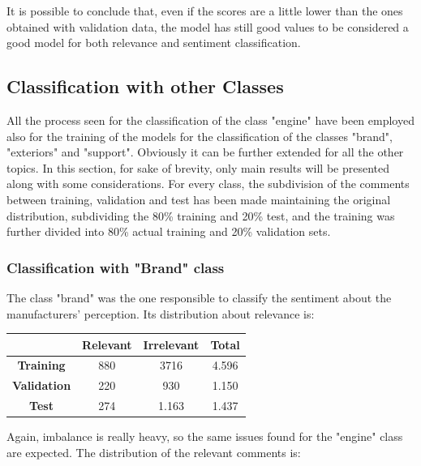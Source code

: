 It is possible to conclude that, even if the scores are a little lower than the ones obtained with validation data, the model has still good values to be considered a good model for both relevance and sentiment classification.


\subsection{Classification with other Classes}

All the process seen for the classification of the class "engine" have been employed also for the training of the models for the classification of the classes "brand", "exteriors" and "support". Obviously it can be further extended for all the other topics. In this section, for sake of brevity, only main results will be presented along with some considerations. For every class, the subdivision of the comments between training, validation and test has been made maintaining the original distribution, subdividing the 80\% training and 20\% test, and the training was further divided into 80\% actual training and 20\% validation sets.

\subsubsection{Classification with "Brand" class}

The class "brand" was the one responsible to classify the sentiment about the manufacturers' perception. Its distribution about relevance is:

\begin{center}
	\begin{tabular}{ | c  c  c | c | } 
		\hline
		& \textbf{Relevant} & \textbf{Irrelevant} & \textbf{Total} \\
		\hline
		\textbf{Training} & 880 & 3716 & 4.596 \\ 
		\hline
		\textbf{Validation} & 220 & 930 & 1.150 \\ 
		\hline
		\textbf{Test} & 274 & 1.163 & 1.437 \\
		\hline
	\end{tabular}
\end{center}

Again, imbalance is really heavy, so the same issues found for the "engine" class are expected. The distribution of the relevant comments is:

